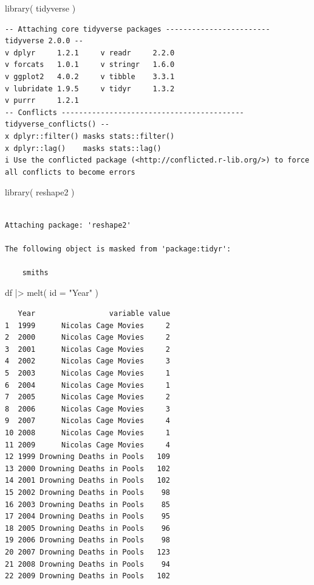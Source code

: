 \documentclass[
  letterpaper,
]{book}
\newenvironment{Shaded}{\begin{snugshade}}{\end{snugshade}}
\newcommand{\AttributeTok}[1]{\textcolor[rgb]{0.40,0.45,0.13}{#1}}
\newcommand{\FunctionTok}[1]{\textcolor[rgb]{0.28,0.35,0.67}{#1}}
\newcommand{\NormalTok}[1]{\textcolor[rgb]{0.00,0.23,0.31}{#1}}
\newcommand{\SpecialCharTok}[1]{\textcolor[rgb]{0.37,0.37,0.37}{#1}}
\newcommand{\StringTok}[1]{\textcolor[rgb]{0.13,0.47,0.30}{#1}}
\begin{document}
\begin{Shaded}
\begin{Highlighting}[]
\FunctionTok{library}\NormalTok{( tidyverse )}
\end{Highlighting}
\end{Shaded}

\begin{verbatim}
-- Attaching core tidyverse packages ------------------------ tidyverse 2.0.0 --
v dplyr     1.2.1     v readr     2.2.0
v forcats   1.0.1     v stringr   1.6.0
v ggplot2   4.0.2     v tibble    3.3.1
v lubridate 1.9.5     v tidyr     1.3.2
v purrr     1.2.1     
-- Conflicts ------------------------------------------ tidyverse_conflicts() --
x dplyr::filter() masks stats::filter()
x dplyr::lag()    masks stats::lag()
i Use the conflicted package (<http://conflicted.r-lib.org/>) to force all conflicts to become errors
\end{verbatim}

\begin{Shaded}
\begin{Highlighting}[]
\FunctionTok{library}\NormalTok{( reshape2 )}
\end{Highlighting}
\end{Shaded}

\begin{verbatim}

Attaching package: 'reshape2'

The following object is masked from 'package:tidyr':

    smiths
\end{verbatim}

\begin{Shaded}
\begin{Highlighting}[]
\NormalTok{df }\SpecialCharTok{|\textgreater{}}
  \FunctionTok{melt}\NormalTok{( }\AttributeTok{id =} \StringTok{"Year"}\NormalTok{ ) }
\end{Highlighting}
\end{Shaded}

\begin{verbatim}
   Year                 variable value
1  1999      Nicolas Cage Movies     2
2  2000      Nicolas Cage Movies     2
3  2001      Nicolas Cage Movies     2
4  2002      Nicolas Cage Movies     3
5  2003      Nicolas Cage Movies     1
6  2004      Nicolas Cage Movies     1
7  2005      Nicolas Cage Movies     2
8  2006      Nicolas Cage Movies     3
9  2007      Nicolas Cage Movies     4
10 2008      Nicolas Cage Movies     1
11 2009      Nicolas Cage Movies     4
12 1999 Drowning Deaths in Pools   109
13 2000 Drowning Deaths in Pools   102
14 2001 Drowning Deaths in Pools   102
15 2002 Drowning Deaths in Pools    98
16 2003 Drowning Deaths in Pools    85
17 2004 Drowning Deaths in Pools    95
18 2005 Drowning Deaths in Pools    96
19 2006 Drowning Deaths in Pools    98
20 2007 Drowning Deaths in Pools   123
21 2008 Drowning Deaths in Pools    94
22 2009 Drowning Deaths in Pools   102
\end{verbatim}
\end{document}
